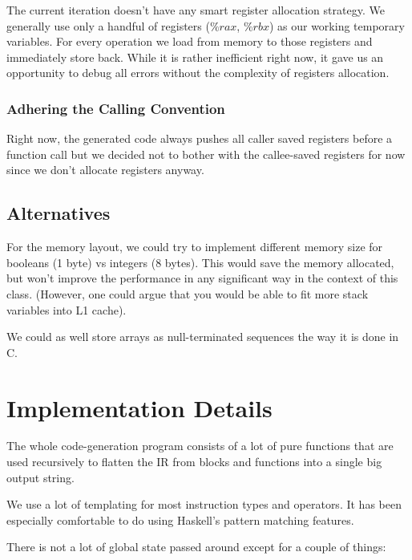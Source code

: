 \documentclass[11pt]{article}
\begin{document}
\par The current iteration doesn't have any smart register allocation strategy. We generally use only a handful of registers ($\%rax$, $\%rbx$) as our working temporary variables. For every operation we load from memory to those registers and immediately store back. While it is rather inefficient right now, it gave us an opportunity to debug all errors without the complexity of registers allocation.

\subsubsection{Adhering the Calling Convention}

\par Right now, the generated code always pushes all caller saved registers before a function call but we decided not to bother with the callee-saved registers for now since we don't allocate registers anyway.

\subsection{Alternatives}

\par For the memory layout, we could try to implement different memory size for booleans (1 byte) vs integers (8 bytes). This would save the memory allocated, but won't improve the performance in any significant way in the context of this class. (However, one could argue that you would be able to fit more stack variables into L1 cache).

\par We could as well store arrays as null-terminated sequences the way it is done in C.

\section{Implementation Details}

\par The whole code-generation program consists of a lot of pure functions that are used recursively to flatten the IR from blocks and functions into a single big output string.

\par We use a lot of templating for most instruction types and operators. It has been especially comfortable to do using Haskell's pattern matching features.

\par There is not a lot of global state passed around except for a couple of things:
\end{document}
